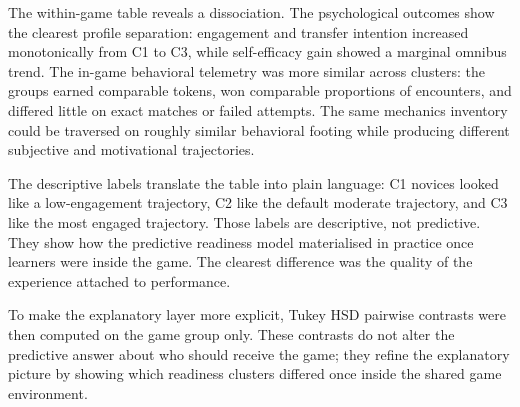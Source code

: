 \documentclass[12pt]{report}
\begin{document}
The within-game table reveals a dissociation. The psychological outcomes show the clearest profile separation: engagement and transfer intention increased monotonically from C1 to C3, while self-efficacy gain showed a marginal omnibus trend. The in-game behavioral telemetry was more similar across clusters: the groups earned comparable tokens, won comparable proportions of encounters, and differed little on exact matches or failed attempts. The same mechanics inventory could be traversed on roughly similar behavioral footing while producing different subjective and motivational trajectories.

The descriptive labels translate the table into plain language: C1 novices looked like a low-engagement trajectory, C2 like the default moderate trajectory, and C3 like the most engaged trajectory. Those labels are descriptive, not predictive. They show how the predictive readiness model materialised in practice once learners were inside the game. The clearest difference was the quality of the experience attached to performance.

To make the explanatory layer more explicit, Tukey HSD pairwise contrasts were then computed on the game group only. These contrasts do not alter the predictive answer about who should receive the game; they refine the explanatory picture by showing which readiness clusters differed once inside the shared game environment.
\end{document}
